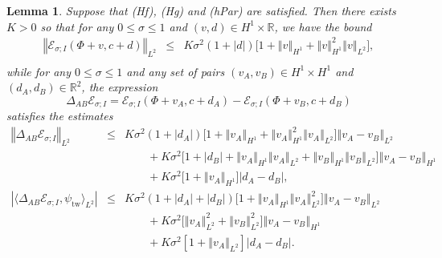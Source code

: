 \documentclass[10pt]{articleHJ}
\newcommand{\Real}{\mathbb{R}}							%
\newcommand{\abs}[1]{\left\vert#1\right\vert}			%
\newcommand{\norm}[1]{\left\Vert#1\right\Vert}		%
\newtheorem{lem}[thm]{Lemma}
\numberwithin{equation}{section}
\begin{document}
\begin{lem}
Suppose that (Hf), (Hg) and (hPar) are satisfied.
Then there exists $K > 0$ so that
for any $0 \le \sigma \le 1$
and $(v, d) \in H^1 \times \Real$,
we have the bound
\begin{equation}
\label{eq:swv:ei:glb:bnds}
\begin{array}{lcl}
 \norm{\mathcal{E}_{\sigma;I}(\Phi + v, c + d)}_{L^2} & \le &
 K \sigma^2 (1 + \abs{d})
 \big[
   1 + \norm{v}_{H^1} + \norm{v}_{H^1}^2 \norm{v}_{L^2}
 \big] ,
\\[0.2cm]
\end{array}
\end{equation}
while for any $0 \le \sigma \le 1$
and any set of pairs
$(v_A, v_B) \in H^1 \times H^1$
and $(d_A, d_B) \in \Real^2$,
the expression
\begin{equation}
\Delta_{AB} \mathcal{E}_{\sigma;I}
=  \mathcal{E}_{\sigma;I}
       (\Phi + v_A, c + d_A )
  - \mathcal{E}_{\sigma;I}
       (\Phi + v_B, c + d_B)
\end{equation}
satisfies the estimates
\begin{equation}
\label{eq:swv:ei:lip:bnds}
\begin{array}{lcl}
\norm{ \Delta_{AB} \mathcal{E}_{\sigma;I} }_{L^2}
  & \le &
K \sigma^2
(1 + \abs{d_A} )
 \big[
   1 + \norm{v_A}_{H^1} + \norm{v_A}_{H^1}^2 \norm{v_A}_{L^2}
 \big] \norm{v_A-v_B}_{L^2}
\\[0.2cm]
& & \qquad
  +K \sigma^2
  \big[1 + \abs{d_B} + \norm{v_A}_{H^1} \norm{v_A}_{L^2}
    + \norm{v_B}_{H^1} \norm{v_B}_{L^2} \big]
    \norm{v_A-v_B}_{H^1}
\\[0.2cm]
& & \qquad  + K\sigma^2 \big[1 + \norm{v_A}_{H^1} \big]
   \abs{d_A - d_B } ,
\\[0.2cm]
%
\abs{\langle
\Delta_{AB} \mathcal{E}_{\sigma;I}
, \psi_{\mathrm{tw}} \rangle_{L^2} }
 & \le &
K \sigma^2
(1 + \abs{d_A} + \abs{d_B} )
 \big[
   1  + \norm{v_A}_{H^1} \norm{v_A}_{L^2}^2
 \big] \norm{v_A-v_B}_{L^2}
\\[0.2cm]
& & \qquad
  +K \sigma^2
  \big[  \norm{v_A}_{L^2}^2 + \norm{v_B}_{L^2}^2 \big]
    \norm{v_A-v_B}_{H^1}
\\[0.2cm]
& & \qquad
+ K\sigma^2 [1 + \norm{v_A}_{L^2} ] \abs{d_A - d_B }.
\end{array}
\end{equation}
\end{lem}
\end{document}
